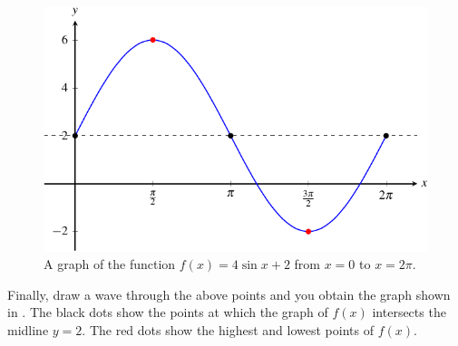 \documentclass[a4paper,oneside,12pt]{article}
\begin{document}
{\begin{solution}
\begin{figure}[!htbp]
\centering
\includegraphics[scale=1.1]{image/13/4-sin-2.pdf}
\caption{%
  A graph of the function $f(x) = 4 \sin x + 2$ from $x = 0$ to
  $x = 2\pi$.
}
\label{fig:trigonometric:4_sinx_2}
\end{figure}

Finally, draw a wave through the above points and you obtain the graph
shown in .  The black dots show the
points at which the graph of $f(x)$ intersects the midline $y = 2$.
The red dots show the highest and lowest points of $f(x)$.
\end{solution}
}{}
\end{document}
